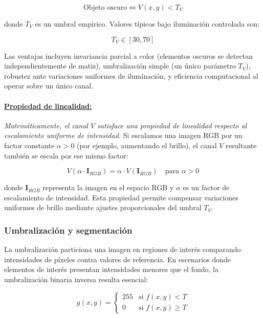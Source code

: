 \begin{equation}
\text{Objeto oscuro} \Leftrightarrow V(x,y) < T_V
\end{equation}

donde $T_V$ es un umbral empírico. Valores típicos bajo iluminación controlada son:

\begin{equation}
T_V \in [30, 70]
\end{equation}

Las ventajas incluyen invariancia parcial a color (elementos oscuros se detectan independientemente de matiz), umbralización simple (un único parámetro $T_V$), robustez ante variaciones uniformes de iluminación, y eficiencia computacional al operar sobre un único canal.

\paragraph{\underline{Propiedad de linealidad:}} \textit{Matemáticamente, el canal $V$ satisface una propiedad de linealidad respecto al escalamiento uniforme de intensidad.} Si escalamos una imagen RGB por un factor constante $\alpha > 0$ (por ejemplo, aumentando el brillo), el canal $V$ resultante también se escala por ese mismo factor:

\begin{equation}
V(\alpha \cdot \mathbf{I}_{RGB}) = \alpha \cdot V(\mathbf{I}_{RGB}) \quad \text{para } \alpha > 0
\end{equation}

donde $\mathbf{I}_{RGB}$ representa la imagen en el espacio RGB y $\alpha$ es un factor de escalamiento de intensidad. Esta propiedad permite compensar variaciones uniformes de brillo mediante ajustes proporcionales del umbral $T_V$.

\subsubsection{Umbralización y segmentación}

La umbralización particiona una imagen en regiones de interés comparando intensidades de píxeles contra valores de referencia. En escenarios donde elementos de interés presentan intensidades menores que el fondo, la umbralización binaria inversa resulta esencial:

\begin{equation}
g(x,y) = \begin{cases}
255 & \text{si } f(x,y) < T \\
0 & \text{si } f(x,y) \geq T
\end{cases}
\end{equation}

